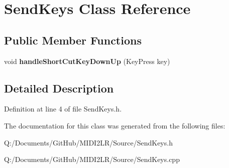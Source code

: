 \hypertarget{class_send_keys}{}\section{Send\+Keys Class Reference}
\label{class_send_keys}
\subsection*{Public Member Functions}
\begin{DoxyCompactItemize}
\item 
void {\bfseries handle\+Short\+Cut\+Key\+Down\+Up} (Key\+Press key)\hypertarget{class_send_keys_af9eb36d2810de268a9e9de30c8019db9}{}\label{class_send_keys_af9eb36d2810de268a9e9de30c8019db9}

\end{DoxyCompactItemize}


\subsection{Detailed Description}


Definition at line 4 of file Send\+Keys.\+h.



The documentation for this class was generated from the following files\+:\begin{DoxyCompactItemize}
\item 
Q\+:/\+Documents/\+Git\+Hub/\+M\+I\+D\+I2\+L\+R/\+Source/Send\+Keys.\+h\item 
Q\+:/\+Documents/\+Git\+Hub/\+M\+I\+D\+I2\+L\+R/\+Source/Send\+Keys.\+cpp\end{DoxyCompactItemize}
